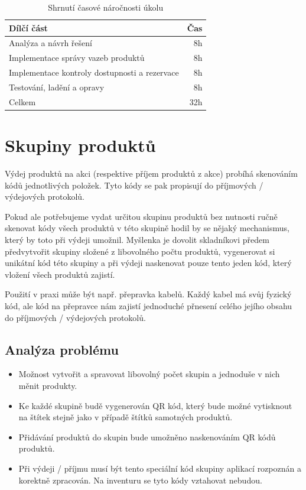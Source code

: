 \begin{table}
	\centering
	\caption[Časová náročnost úkolu na vázané produkty]{Shrnutí časové náročnosti úkolu}
	\label{tab:TopLevelTableLabel}
	{
		\begin{tabular}{lr}
			\toprule
			Dílčí část & Čas\\
			\midrule
			Analýza a návrh řešení & 8h \\
			Implementace správy vazeb produktů & 8h \\
            Implementace kontroly dostupnosti a rezervace & 8h \\
            Testování, ladění a opravy & 8h \\
            \midrule
            Celkem  & 32h \\
			\midrule
		\end{tabular}
	}
\end{table}


\section{Skupiny produktů}

Výdej produktů na akci (respektive příjem produktů z akce) probíhá skenováním kódů jednotlivých položek. Tyto kódy se pak propisují do příjmových / výdejových protokolů.

Pokud ale potřebujeme vydat určitou skupinu produktů bez nutnosti ručně skenovat kódy všech produktů v této skupině hodil by se nějaký mechanismus, který by toto při výdeji umožnil. Myšlenka je dovolit skladníkovi předem předvytvořit skupiny složené z libovolného počtu produktů, vygenerovat si unikátní kód této skupiny a při výdeji naskenovat pouze tento jeden kód, který vložení všech produktů zajistí. 

Použití v praxi může být např. přepravka kabelů. Každý kabel má svůj fyzický kód, ale kód na přepravce nám zajistí jednoduché přnesení celého jejího obsahu do příjmových / výdejových protokolů.

\subsection{Analýza problému}

\begin{itemize}
    \item Možnost vytvořit a spravovat libovolný počet skupin a jednoduše v nich měnit produkty.
    \item Ke každé skupině budě vygenerován QR kód, který bude možné vytisknout na štítek stejně jako v případě štítků samotných produktů.
    \item Přidávání produktů do skupin bude umožněno naskenováním QR kódů produktů.
    \item Při výdeji / příjmu musí být tento speciální kód skupiny aplikací rozpoznán a korektně zpracován. Na inventuru se tyto kódy vztahovat nebudou.
\end{itemize}

